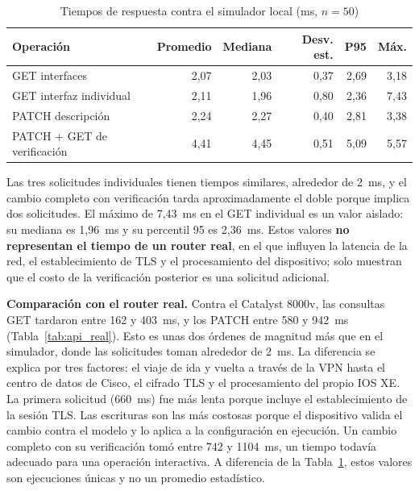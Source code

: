 \begin{table}[H]
\centering
\caption{Tiempos de respuesta contra el simulador local (ms, $n=50$)}
\label{tab:tiempos}
\begin{tabular}{lrrrrr}
\toprule
\textbf{Operación} & \textbf{Promedio} & \textbf{Mediana} & \textbf{Desv. est.} & \textbf{P95} & \textbf{Máx.} \\
\midrule
GET interfaces & 2,07 & 2,03 & 0,37 & 2,69 & 3,18 \\
GET interfaz individual & 2,11 & 1,96 & 0,80 & 2,36 & 7,43 \\
PATCH descripción & 2,24 & 2,27 & 0,40 & 2,81 & 3,38 \\
PATCH + GET de verificación & 4,41 & 4,45 & 0,51 & 5,09 & 5,57 \\
\bottomrule
\end{tabular}
\end{table}

Las tres solicitudes individuales tienen tiempos similares, alrededor de 2~ms, y el cambio completo con verificación tarda aproximadamente el doble porque implica dos solicitudes. El máximo de 7,43~ms en el GET individual es un valor aislado: su mediana es 1,96~ms y su percentil 95 es 2,36~ms. Estos valores \textbf{no representan el tiempo de un router real}, en el que influyen la latencia de la red, el establecimiento de TLS y el procesamiento del dispositivo; solo muestran que el costo de la verificación posterior es una solicitud adicional.

\textbf{Comparación con el router real.} Contra el Catalyst 8000v, las consultas GET tardaron entre 162 y 403~ms, y los PATCH entre 580 y 942~ms (Tabla~\ref{tab:api_real}). Esto es unas dos órdenes de magnitud más que en el simulador, donde las solicitudes toman alrededor de 2~ms. La diferencia se explica por tres factores: el viaje de ida y vuelta a través de la VPN hasta el centro de datos de Cisco, el cifrado TLS y el procesamiento del propio IOS XE. La primera solicitud (660~ms) fue más lenta porque incluye el establecimiento de la sesión TLS. Las escrituras son las más costosas porque el dispositivo valida el cambio contra el modelo y lo aplica a la configuración en ejecución. Un cambio completo con su verificación tomó entre 742 y 1104~ms, un tiempo todavía adecuado para una operación interactiva. A diferencia de la Tabla~\ref{tab:tiempos}, estos valores son ejecuciones únicas y no un promedio estadístico.

